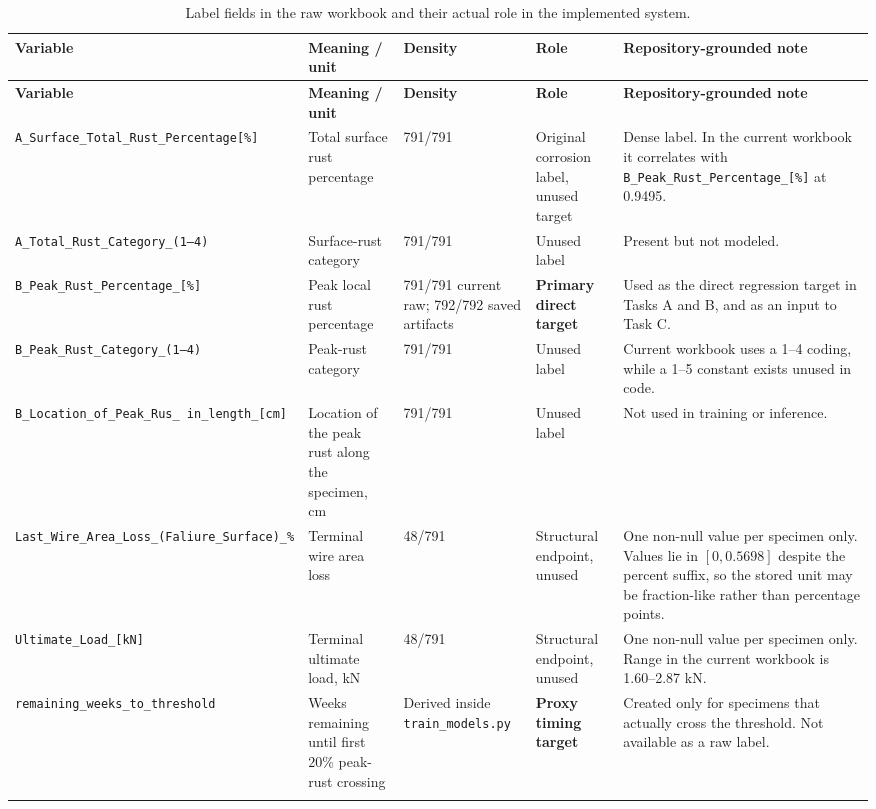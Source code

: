 \documentclass[11pt]{article}
\begin{document}
\begin{longtable}{p{} p{} p{} p{} p{}}
\toprule
\textbf{Variable} & \textbf{Meaning / unit} & \textbf{Density} & \textbf{Role} & \textbf{Repository-grounded note} \\
\midrule
\endfirsthead
\toprule
\textbf{Variable} & \textbf{Meaning / unit} & \textbf{Density} & \textbf{Role} & \textbf{Repository-grounded note} \\
\midrule
\endhead
\texttt{A\_Surface\_Total\_Rust\_Percentage[\%]} & Total surface rust percentage & 791/791 & Original corrosion label, unused target & Dense label. In the current workbook it correlates with \texttt{B\_Peak\_Rust\_Percentage\_[\%]} at 0.9495. \\
\texttt{A\_Total\_Rust\_Category\_(1--4)} & Surface-rust category & 791/791 & Unused label & Present but not modeled. \\
\texttt{B\_Peak\_Rust\_Percentage\_[\%]} & Peak local rust percentage & 791/791 current raw; 792/792 saved artifacts & \textbf{Primary direct target} & Used as the direct regression target in Tasks A and B, and as an input to Task C. \\
\texttt{B\_Peak\_Rust\_Category\_(1--4)} & Peak-rust category & 791/791 & Unused label & Current workbook uses a 1--4 coding, while a 1--5 constant exists unused in code. \\
\texttt{B\_Location\_of\_Peak\_Rus\_\ in\_length\_[cm]} & Location of the peak rust along the specimen, cm & 791/791 & Unused label & Not used in training or inference. \\
\texttt{Last\_Wire\_Area\_Loss\_(Faliure\_Surface)\_\%} & Terminal wire area loss & 48/791 & Structural endpoint, unused & One non-null value per specimen only. Values lie in \([0,0.5698]\) despite the percent suffix, so the stored unit may be fraction-like rather than percentage points. \\
\texttt{Ultimate\_Load\_[kN]} & Terminal ultimate load, kN & 48/791 & Structural endpoint, unused & One non-null value per specimen only. Range in the current workbook is 1.60--2.87 kN. \\
\texttt{remaining\_weeks\_to\_threshold} & Weeks remaining until first \(20\%\) peak-rust crossing & Derived inside \texttt{train\_models.py} & \textbf{Proxy timing target} & Created only for specimens that actually cross the threshold. Not available as a raw label. \\
\bottomrule
\caption{Label fields in the raw workbook and their actual role in the implemented system.}
\label{tab:label_dictionary}
\end{longtable}
\end{document}
